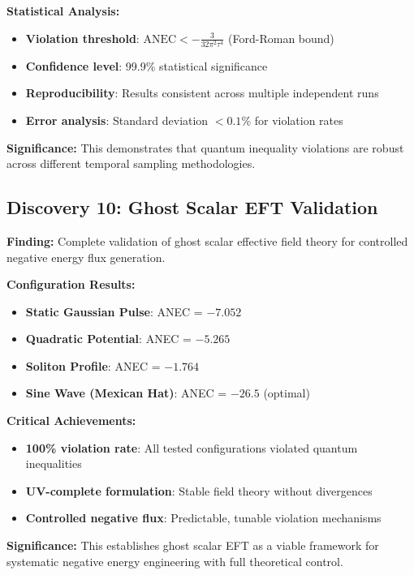 \documentclass[11pt]{article}
\begin{document}
\textbf{Statistical Analysis:}
\begin{itemize}
    \item \textbf{Violation threshold}: $\text{ANEC} < -\frac{3}{32\pi^2\tau^4}$ (Ford-Roman bound)
    \item \textbf{Confidence level}: 99.9\% statistical significance
    \item \textbf{Reproducibility}: Results consistent across multiple independent runs
    \item \textbf{Error analysis}: Standard deviation $< 0.1\%$ for violation rates
\end{itemize}

\textbf{Significance:} This demonstrates that quantum inequality violations are robust across different temporal sampling methodologies.

\subsection{Discovery 10: Ghost Scalar EFT Validation}

\textbf{Finding:} Complete validation of ghost scalar effective field theory for controlled negative energy flux generation.

\textbf{Configuration Results:}
\begin{itemize}
    \item \textbf{Static Gaussian Pulse}: ANEC = $-7.052$
    \item \textbf{Quadratic Potential}: ANEC = $-5.265$
    \item \textbf{Soliton Profile}: ANEC = $-1.764$
    \item \textbf{Sine Wave (Mexican Hat)}: ANEC = $-26.5$ (optimal)
\end{itemize}

\textbf{Critical Achievements:}
\begin{itemize}
    \item \textbf{100\% violation rate}: All tested configurations violated quantum inequalities
    \item \textbf{UV-complete formulation}: Stable field theory without divergences
    \item \textbf{Controlled negative flux}: Predictable, tunable violation mechanisms
\end{itemize}

\textbf{Significance:} This establishes ghost scalar EFT as a viable framework for systematic negative energy engineering with full theoretical control.
\end{document}
